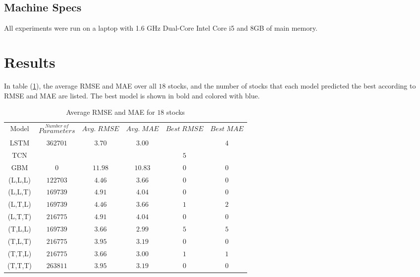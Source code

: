 \documentclass[12pt, A4]{article}
\begin{document}
\subsection{Machine Specs}
All experiments were run on a laptop with 1.6 GHz Dual-Core Intel Core i5 and $8$GB of main memory.

\section{Results}

In table (\ref{Average RMSE_MAE_results}), the average RMSE and MAE over all $18$ stocks, and the number of stocks that each model predicted the best according to RMSE and MAE are listed. The best model is shown in bold and colored with blue.
\begin{table}[H]
	\footnotesize
	\begin{center}
		\begin{tabular}{| c | c | c | c | c | c |}
			\hline 
			Model & $\stackrel{Number\; of}{Parameters}$ & $Avg.\; RMSE$ & $Avg.\; MAE$ & $Best \;RMSE$ & $Best\; MAE$ \\ \cline{1-6}
			LSTM & $362701$& $3.70$ & $3.00$  &\cellcolor{blue!25}  \boldmath{$6$} & $4$ \\ \cline{1-6}
			TCN & \cellcolor{blue!25}  \boldmath{$87937$}&\cellcolor{blue!25}   \boldmath{$3.49$} &\cellcolor{blue!25}   \boldmath{$2.79$} & $5$ & \cellcolor{blue!25}  \boldmath{$6$}  \\ \cline{1-6}
			GBM & $0$ &$11.98$ & $10.83$ & $0$ & $0$ \\ \cline{1-6}
			(L,L,L)& $122703$ & $4.46$ & $3.66$ & $0$ & $0$  \\ \cline{1-6}
			(L,L,T) & $169739$ & $4.91$ & $4.04$  & $0$ & $0$ \\ \cline{1-6}
			(L,T,L) &  $169739$ & $4.46$ & $3.66$  & $1$ & $2$ \\ \cline{1-6}
			(L,T,T) & $216775$ & $4.91$ & $4.04$  & $0$ & $0$ \\ \cline{1-6}
			(T,L,L) & $169739$ & $3.66$ & $2.99$  & $5$ & $5$ \\ \cline{1-6}
			(T,L,T) & $216775$ & $3.95$ & $3.19$  & $0$ & $0$ \\ \cline{1-6}
			(T,T,L) & $216775$ & $3.66$ & $3.00$  & $1$ & $1$ \\ \cline{1-6}
			(T,T,T) & $263811$ & $3.95$ & $3.19$  & $0$ & $0$ \\ \cline{1-6}			
		\end{tabular}
		\caption{Average RMSE and MAE for $18$ stocks} \label{Average RMSE_MAE_results}
	\end{center}
\end{table}
\end{document}
